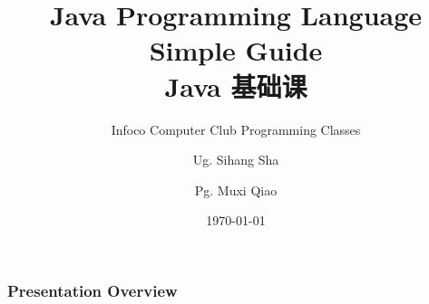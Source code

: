 \documentclass[
  11pt, %
  xcolor=dvipsnames
]{beamer}
\title[Java Sec.1]{Java Programming Language Simple Guide \\ Java 基础课} %
\subtitle{Infoco Computer Club Programming Classes \\ } %
\author[SSH. \and MXQ. (TA)]{Ug. Sihang Sha \and Pg. Muxi Qiao} %
\institute[XJTLU InfoCo Club]{Xiann' Jiaotong Livepool University \\ \smallskip \textit{infoco@xjtlu.edu.cn}} %
\date[\today]{\today} %
\begin{document}

\begin{frame}
	\titlepage %

\end{frame}




\begin{frame}[allowframebreaks]
	\frametitle{Presentation Overview} %

	\tableofcontents %

\end{frame}

\end{document}
